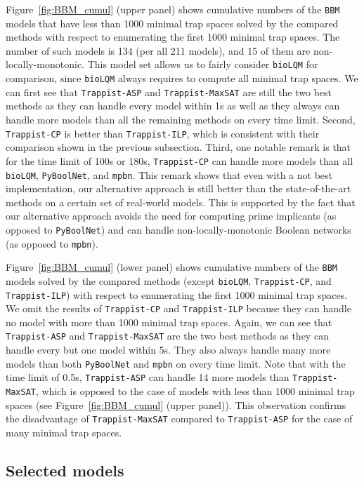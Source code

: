 \documentclass[preprint,12pt]{elsarticle}
\begin{document}
Figure~\ref{fig:BBM_cumul} (upper panel) shows cumulative numbers of the \texttt{BBM} models that have less than 1000 minimal trap spaces solved by the compared methods with respect to enumerating the first 1000 minimal trap spaces.
The number of such models is 134 (per all 211 models), and 15 of them are non-locally-monotonic.
This model set allows us to fairly consider \texttt{bioLQM} for comparison, since \texttt{bioLQM} always requires to compute all minimal trap spaces.
We can first see that \texttt{Trappist-ASP} and \texttt{Trappist-MaxSAT} are still the two best methods as they can handle every model within 1s as well as they always can handle more models than all the remaining methods on every time limit.
Second, \texttt{Trappist-CP} is better than \texttt{Trappist-ILP}, which is consistent with their comparison shown in the previous subsection.
Third, one notable remark is that for the time limit of 100s or 180s, \texttt{Trappist-CP} can handle more models than all \texttt{bioLQM}, \texttt{PyBoolNet}, and \texttt{mpbn}.
This remark shows that even with a not best implementation, our alternative approach is still better than the state-of-the-art methods on a certain set of real-world models.
This is supported by the fact that our alternative approach avoids the need for computing prime implicants (as opposed to \texttt{PyBoolNet}) and can handle non-locally-monotonic Boolean networks (as opposed to \texttt{mpbn}).


Figure~\ref{fig:BBM_cumul} (lower panel) shows cumulative numbers of the \texttt{BBM} models solved by the compared methods (except \texttt{bioLQM}, \texttt{Trappist-CP}, and \texttt{Trappist-ILP}) with respect to enumerating the first 1000 minimal trap spaces.
We omit the results of \texttt{Trappist-CP} and \texttt{Trappist-ILP} because they can handle no model with more than 1000 minimal trap spaces.
Again, we can see that \texttt{Trappist-ASP} and \texttt{Trappist-MaxSAT} are the two best methods as they can handle every but one model within 5s. They also always handle many more models than both \texttt{PyBoolNet} and \texttt{mpbn} on every time limit.
Note that with the time limit of 0.5s, \texttt{Trappist-ASP} can handle 14 more models than \texttt{Trappist-MaxSAT}, which is opposed to the case of models with less than 1000 minimal trap spaces (see Figure~\ref{fig:BBM_cumul} (upper panel)).
This observation confirms the disadvantage of \texttt{Trappist-MaxSAT} compared to \texttt{Trappist-ASP} for the case of many minimal trap spaces.


\subsection{Selected models}
\label{subsec:Selected_models}
\end{document}

